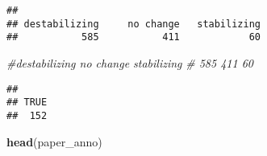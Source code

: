\documentclass[
]{article}
\newenvironment{Shaded}{\begin{snugshade}}{\end{snugshade}}
\newcommand{\CommentTok}[1]{\textcolor[rgb]{0.56,0.35,0.01}{\textit{#1}}}
\newcommand{\FunctionTok}[1]{\textcolor[rgb]{0.13,0.29,0.53}{\textbf{#1}}}
\newcommand{\NormalTok}[1]{#1}
\newcommand{\OtherTok}[1]{\textcolor[rgb]{0.56,0.35,0.01}{#1}}
\newcommand{\SpecialCharTok}[1]{\textcolor[rgb]{0.81,0.36,0.00}{\textbf{#1}}}
\newcommand{\StringTok}[1]{\textcolor[rgb]{0.31,0.60,0.02}{#1}}
\begin{document}
\begin{verbatim}
## 
## destabilizing     no change   stabilizing 
##           585           411            60
\end{verbatim}

\begin{Shaded}
\begin{Highlighting}[]
\CommentTok{\#destabilizing     no change   stabilizing }
\CommentTok{\#          585           411            60 }
\end{Highlighting}
\end{Shaded}

\begin{Shaded}
\end{Shaded}

\begin{verbatim}
## 
## TRUE 
##  152
\end{verbatim}

\begin{Shaded}
\begin{Highlighting}[]
\FunctionTok{head}\NormalTok{(paper\_anno)}
\end{Highlighting}
\end{Shaded}
\end{document}
